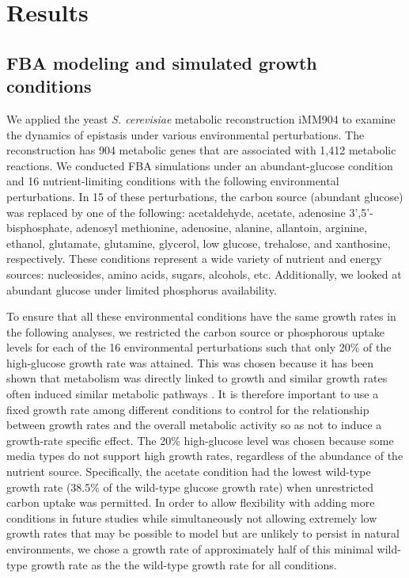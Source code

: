 \section{Results}

\subsection{FBA modeling and simulated growth conditions}

We applied the yeast \textit{S. cerevisiae} metabolic reconstruction
iMM904 \citep{Mo2009} to examine the dynamics of epistasis under various
environmental perturbations. The reconstruction has 904 metabolic
genes that are associated with 1,412 metabolic reactions. We conducted
FBA simulations under an abundant-glucose condition and 16
nutrient-limiting conditions with the following environmental
perturbations. In 15 of these perturbations, the carbon source
(abundant glucose) was replaced by one of the following: acetaldehyde,
acetate, adenosine 3',5'-bisphosphate, adenosyl methionine, adenosine,
alanine, allantoin, arginine, ethanol, glutamate, glutamine, glycerol,
low glucose, trehalose, and xanthosine, respectively. These conditions
represent a wide variety of nutrient and energy sources: nucleosides,
amino acids, sugars, alcohols, etc. Additionally, we looked at
abundant glucose under limited phosphorus availability.

To ensure that all these environmental conditions have the same growth
rates in the following analyses, we restricted the carbon source or
phosphorous uptake levels for each of the 16 environmental
perturbations such that only 20\% of the high-glucose growth rate was
attained. This was chosen because it has been shown that metabolism
was directly linked to growth and similar growth rates often induced
similar metabolic pathways \citep{Jakubowska2012}. It is therefore
important to use a fixed growth rate among different conditions to
control for the relationship between growth rates and the overall
metabolic activity so as not to induce a growth-rate specific
effect. The 20\% high-glucose level was chosen because some media
types do not support high growth rates, regardless of the abundance of
the nutrient source. Specifically, the acetate condition had the
lowest wild-type growth rate (38.5\% of the wild-type glucose growth
rate) when unrestricted carbon uptake was permitted. In order to allow
flexibility with adding more conditions in future studies while
simultaneously not allowing extremely low growth rates that may be
possible to model but are unlikely to persist in natural environments,
we chose a growth rate of approximately half of this minimal wild-type
growth rate as the the wild-type growth rate for all conditions.

